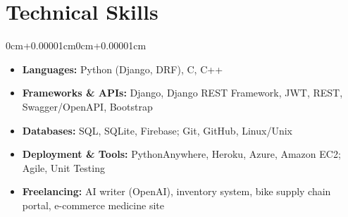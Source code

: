 \documentclass[10pt, letterpaper]{article}
\newenvironment{highlightscompact}{
    \begin{itemize}[topsep=0.04cm, parsep=0.04cm, partopsep=0pt, itemsep=0pt, leftmargin=10pt]
}{
    \end{itemize}
}
\newenvironment{onecolentry}{
    \begin{adjustwidth}{0cm+0.00001cm}{0cm+0.00001cm}
}{
    \end{adjustwidth}
}
\begin{document}
    \section{Technical Skills}
    \begin{onecolentry}
        \begin{highlightscompact}
            \item \textbf{Languages:} Python (Django, DRF), C, C++
            \item \textbf{Frameworks \& APIs:} Django, Django REST Framework, JWT, REST, Swagger/OpenAPI, Bootstrap
            \item \textbf{Databases:} SQL, SQLite, Firebase; Git, GitHub, Linux/Unix
            \item \textbf{Deployment \& Tools:} PythonAnywhere, Heroku, Azure, Amazon EC2; Agile, Unit Testing
            \item \textbf{Freelancing:} AI writer (OpenAI), inventory system, bike supply chain portal, e-commerce medicine site
        \end{highlightscompact}
    \end{onecolentry}
\end{document}
